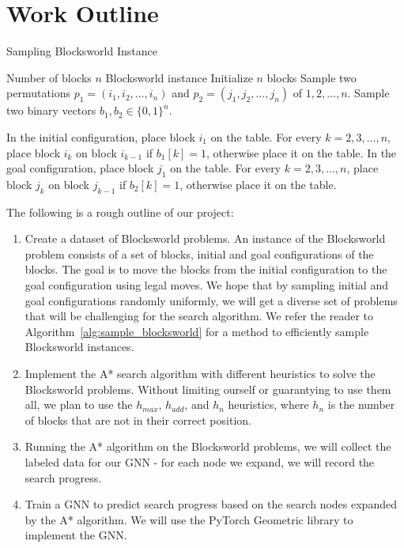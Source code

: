 \documentclass[12pt]{article}
\begin{document}
\section{Work Outline}

\begin{algorithm}
  \caption{Sampling Blocksworld Instance}
  \label{alg:sample_blocksworld}
  \begin{algorithmic}[1]
    \Require Number of blocks $n$
    \Ensure Blocksworld instance
    \State Initialize $n$ blocks
    \State Sample two permutations $p_1 = (i_1, i_2, \ldots, i_n)$ and $p_2 = (j_1, j_2, \ldots, j_n)$ of $1, 2, \ldots, n$.
    \State Sample two binary vectors $b_1, b_2 \in \{0, 1\}^n$.

    \State In the initial configuration, place block $i_1$ on the table. For every $k = 2, 3, \ldots, n$, place block $i_k$ on block $i_{k-1}$ if $b_1[k] = 1$, otherwise place it on the table.
    \State In the goal configuration, place block $j_1$ on the table. For every $k = 2, 3, \ldots, n$, place block $j_k$ on block $j_{k-1}$ if $b_2[k] = 1$, otherwise place it on the table.

  \end{algorithmic}
\end{algorithm}




The following is a rough outline of our project:
\begin{enumerate}
  \item Create a dataset of Blocksworld problems. An instance of the Blocksworld problem consists of a set of blocks, initial and goal configurations of the blocks. The goal is to move the blocks from the initial configuration to the goal configuration using legal moves. We hope that by sampling initial and goal configurations randomly uniformly, we will get a diverse set of problems that will be challenging for the search algorithm. We refer the reader to Algorithm~\ref{alg:sample_blocksworld} for a method to efficiently sample Blocksworld instances.
  \item Implement the A* search algorithm with different heuristics to solve the Blocksworld problems. Without limiting ourself or guarantying to use them all, we plan to use the $h_{max}$, $h_{add}$, and $h_{n}$ heuristics, where $h_{n}$ is the number of blocks that are not in their correct position.
  \item Running the A* algorithm on the Blocksworld problems, we will collect the labeled data for our GNN - for each node we expand, we will record the search progress.
  \item Train a GNN to predict search progress based on the search nodes expanded by the A* algorithm. We will use the PyTorch Geometric library to implement the GNN.
\end{enumerate}
\end{document}
